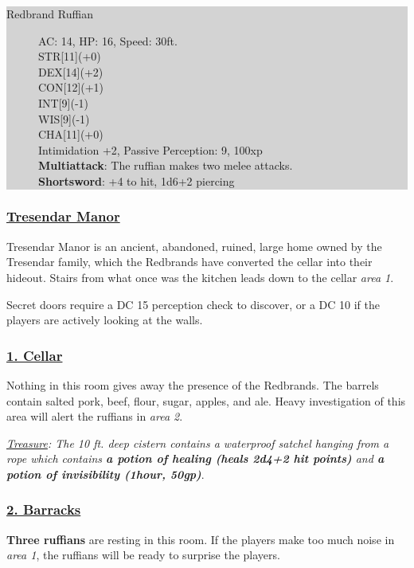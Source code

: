 \colorbox{lightgray}{\begin{minipage}{0.4\textwidth}
		\begin{description}
			\item[Redbrand Ruffian]
			AC: 14, HP: 16, Speed: 30ft.
			\\ STR[11](+0) 
			\\ DEX[14](+2)
			\\ CON[12](+1)
			\\ INT[9](-1)
			\\ WIS[9](-1)
			\\ CHA[11](+0) 
			\\ Intimidation +2, Passive Perception: 9, 100xp
			\\ \textbf{Multiattack}: The ruffian makes two melee attacks.
			\\ \textbf{Shortsword}: +4 to hit, 1d6+2 piercing
		\end{description}
\end{minipage}}
\break

\subsubsection*{\underline{Tresendar Manor}}
Tresendar Manor is an ancient, abandoned, ruined, large home owned by the Tresendar family, which the Redbrands have converted the cellar into their hideout. Stairs from what once was the kitchen leads down to the cellar \emph{area 1}.

Secret doors require a DC 15 perception check to discover, or a DC 10 if the players are actively looking at the walls.

\subsubsection*{\underline{1. Cellar}}
Nothing in this room gives away the presence of the Redbrands. The barrels contain salted pork, beef, flour, sugar, apples, and ale. Heavy investigation of this area will alert the ruffians in \emph{area 2}.

\emph{\underline{Treasure}: The 10 ft. deep cistern contains a waterproof satchel hanging from a rope which contains \textbf{a potion of healing (heals 2d4+2 hit points)} and \textbf{a potion of invisibility (1hour, 50gp)}}.

\subsubsection*{\underline{2. Barracks}}
\textbf{Three ruffians} are resting in this room. If the players make too much noise in \emph{area 1}, the ruffians will be ready to surprise the players.

